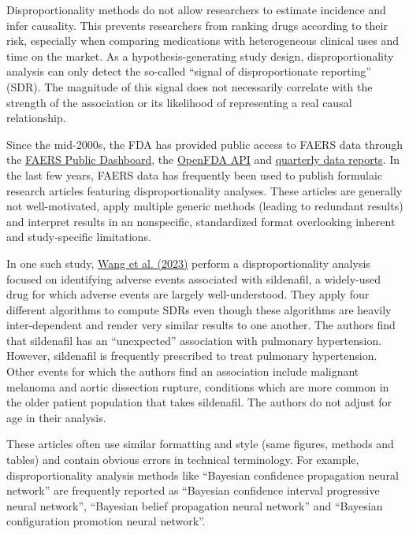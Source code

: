 \documentclass[letterpaper, 12pt]{article}
\begin{document}
Disproportionality methods do not allow researchers to estimate incidence and infer causality. This prevents researchers from ranking drugs according to their risk, especially when comparing medications with heterogeneous clinical uses and time on the market. As a hypothesis-generating study design, disproportionality analysis can only detect the so-called ``signal of disproportionate reporting'' (SDR). The magnitude of this signal does not necessarily correlate with the strength of the association or its likelihood of representing a real causal relationship.

Since the mid-2000s, the FDA has provided public access to FAERS data through the \href{https://fis.fda.gov/sense/app/95239e26-e0be-42d9-a960-9a5f7f1c25ee/sheet/7a47a261-d58b-4203-a8aa-6d3021737452/state/analysis}{FAERS Public Dashboard}, the \href{https://open.fda.gov/}{OpenFDA API} and \href{https://www.fda.gov/drugs/fdas-adverse-event-reporting-system-faers/fda-adverse-event-reporting-system-faers-latest-quarterly-data-files}{quarterly data reports}. In the last few years, FAERS data has frequently been used to publish formulaic research articles featuring disproportionality analyses. These articles are generally not well-motivated, apply multiple generic methods (leading to redundant results) and interpret results in an nonspecific, standardized format overlooking inherent and study-specific limitations.

In one such study, \href{https://doi.org/10.1111/andr.13533}{Wang et al. (2023)} perform a disproportionality analysis focused on identifying adverse events associated with sildenafil, a widely-used drug for which adverse events are largely well-understood. They apply four different algorithms to compute SDRs even though these algorithms are heavily inter-dependent and render very similar results to one another. The authors find that sildenafil has an ``unexpected'' association with pulmonary hypertension. However, sildenafil is frequently prescribed to treat pulmonary hypertension. Other events for which the authors find an association include malignant melanoma and aortic dissection rupture, conditions which are more common in the older patient population that takes sildenafil. The authors do not adjust for age in their analysis.

These articles often use similar formatting and style (same figures, methods and tables) and contain obvious errors in technical terminology. For example, disproportionality analysis methods like ``Bayesian confidence propagation neural network'' are frequently reported as ``Bayesian confidence interval progressive neural network'', ``Bayesian belief propagation neural network'' and ``Bayesian configuration promotion neural network''. 
\end{document}
